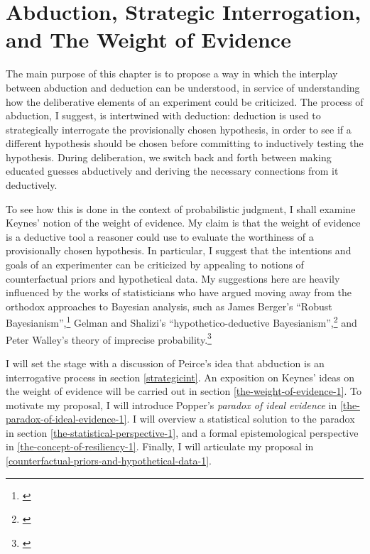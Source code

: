 
\hypertarget{abduction-resiliency-and-the-weight-of-evidence-1}{%
\chapter{Abduction, Strategic Interrogation, and The Weight of
Evidence}\label{ch:woe}}



The main purpose of this chapter is to propose a way in which the interplay between abduction and deduction can be understood, in service of understanding how the deliberative elements of an experiment could be criticized. The process of abduction, I suggest, is intertwined with deduction: deduction is used to strategically interrogate the provisionally chosen hypothesis, in order to see if a different hypothesis should be chosen before committing to inductively testing the hypothesis. During deliberation, we switch back and forth between making educated guesses abductively and deriving the necessary connections from it deductively. 

To see how this is done in the context of probabilistic judgment, I shall examine Keynes' notion of the weight of evidence. My claim is that the weight of evidence is a deductive tool a reasoner could use to evaluate the worthiness of a provisionally chosen hypothesis. In particular, I suggest that the intentions and goals of an experimenter can be criticized by appealing to notions of counterfactual priors and hypothetical data. My suggestions here are heavily influenced by the works of statisticians
who have argued moving away from the orthodox approaches to Bayesian
analysis, such as James Berger's ``Robust Bayesianism'',\footnote{\cite{robust}} Gelman and
Shalizi's ``hypothetico-deductive Bayesianism'',\footnote{\cite{gelman}} and Peter Walley's theory of imprecise probability.\footnote{\cite{walley}}



I will set the stage with a discussion of Peirce's idea that abduction is an interrogative process in section \ref{strategicint}. An exposition on Keynes' ideas on the weight of evidence will be carried out in section \ref{the-weight-of-evidence-1}. To motivate my proposal, I will introduce Popper's \emph{paradox of ideal evidence} in \ref{the-paradox-of-ideal-evidence-1}. I will overview a statistical solution to the paradox in section \ref{the-statistical-perspective-1}, and a formal epistemological perspective in \ref{the-concept-of-resiliency-1}. Finally, I will articulate my proposal in \ref{counterfactual-priors-and-hypothetical-data-1}.

